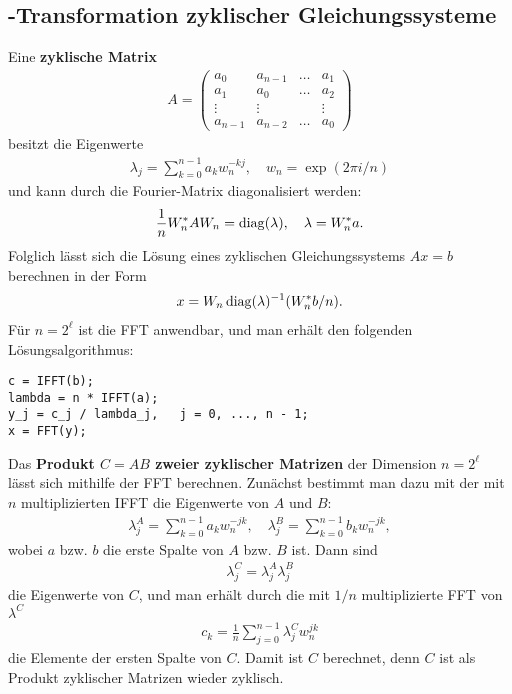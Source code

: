 \pagebreak

\subsection{%
    -Transformation zyklischer Gleichungssysteme%
}

Eine \textbf{zyklische Matrix}
\begin{align*}
    A =
    \begin{pmatrix}
        a_0 & a_{n-1} & \dots & a_1 \\
        a_1 & a_0 & \dots & a_2 \\
        \vdots & \vdots & & \vdots \\
        a_{n-1} & a_{n-2} & \dots & a_0
    \end{pmatrix}
\end{align*}
besitzt die Eigenwerte
\begin{align*}
    \lambda_j = \sum_{k=0}^{n-1} a_k w_n^{-kj}, \quad
    w_n = \exp(2 \pi i / n)
\end{align*}
und kann durch die Fourier-Matrix diagonalisiert werden:
\begin{align*}
    \frac{1}{n} W_n^\ast A W_n = \operatorname{diag}(\lambda), \quad
    \lambda = W_n^\ast a.
\end{align*}
Folglich lässt sich die Lösung eines zyklischen Gleichungssystems $Ax = b$
berechnen in der Form
\begin{align*}
    x = W_n \operatorname{diag}(\lambda)^{-1} (W_n^\ast b / n).
\end{align*}
Für $n = 2^\ell$ ist die FFT anwendbar, und man erhält den folgenden
Lösungsalgorithmus:
\begin{lstlisting}
c = IFFT(b);
lambda = n * IFFT(a);
y_j = c_j / lambda_j,   j = 0, ..., n - 1;
x = FFT(y);
\end{lstlisting}

\linie

Das \textbf{Produkt $C = AB$ zweier zyklischer Matrizen} der Dimension
$n = 2^\ell$ lässt sich mithilfe der FFT berechnen.
Zunächst bestimmt man dazu mit der mit $n$ multiplizierten IFFT die
Eigenwerte von $A$ und $B$:
\begin{align*}
    \lambda_j^A = \sum_{k=0}^{n-1} a_k w_n^{-jk}, \quad
    \lambda_j^B = \sum_{k=0}^{n-1} b_k w_n^{-jk},
\end{align*}
wobei $a$ bzw. $b$ die erste Spalte von $A$ bzw. $B$ ist.
Dann sind
\begin{align*}
    \lambda_j^C = \lambda_j^A \lambda_j^B
\end{align*}
die Eigenwerte von $C$, und man erhält durch die mit $1/n$ multiplizierte FFT
von $\lambda^C$
\begin{align*}
    c_k = \frac{1}{n} \sum_{j=0}^{n-1} \lambda_j^C w_n^{jk}
\end{align*}
die Elemente der ersten Spalte von $C$.
Damit ist $C$ berechnet, denn $C$ ist als Produkt zyklischer Matrizen
wieder zyklisch.

